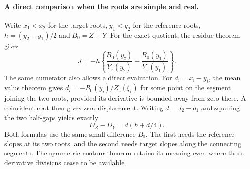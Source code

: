 \paragraph{A direct comparison when the roots are simple and real.}
Write \(x_1<x_2\) for the target roots, \(y_1<y_2\) for the reference roots, \(h=(y_2-y_1)/2\) and \(B_0=Z-Y\). For the exact quotient, the residue theorem gives
\begin{equation}
 J=-h\left\{\frac{B_0(y_2)}{Y_z(y_2)}
                  -\frac{B_0(y_1)}{Y_z(y_1)}\right\}. \label{eq:residue}
\end{equation}
The same numerator also allows a direct evaluation. For \(d_i=x_i-y_i\), the mean value theorem gives \(d_i=-B_0(y_i)/Z_z(\xi_i)\) for some point on the segment joining the two roots, provided its derivative is bounded away from zero there. A coincident root then gives zero displacement. Writing \(d=d_2-d_1\) and squaring the two half-gaps yields exactly
\begin{equation}
 D_Z-D_Y=d(h+d/4). \label{eq:direct}
\end{equation}
Both formulas use the same small difference \(B_0\). The first needs the reference slopes at its two roots, and the second needs target slopes along the connecting segments. The symmetric contour theorem retains its meaning even where those derivative divisions cease to be available.
